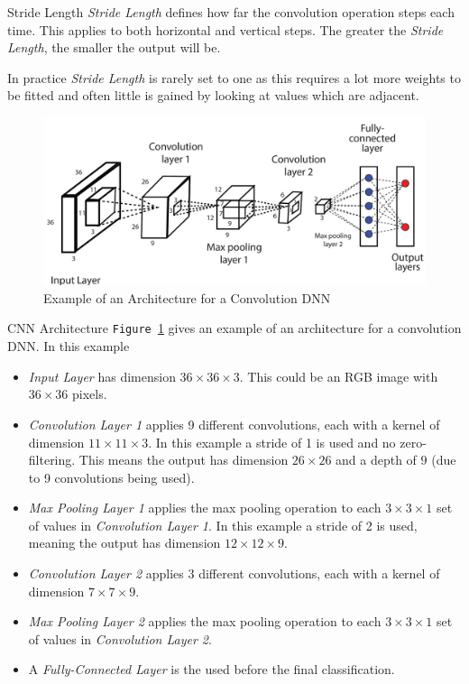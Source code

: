 \documentclass[11pt,a4paper]{article}
\begin{document}
  \begin{definition}{Stride Length}
    \textit{Stride Length} defines how far the convolution operation steps each time. This applies to both horizontal and vertical steps. The greater the \textit{Stride Length}, the smaller the output will be.
    \par In practice \textit{Stride Length} is rarely set to one as this requires a lot more weights to be fitted and often little is gained by looking at values which are adjacent.
  \end{definition}

  \begin{figure}[ht!]
    \centering
    \includegraphics[width=.5\textwidth]{CNNArchitectureDiagram.jpg}
    \caption{Example of an Architecture for a Convolution DNN}
    \label{fig_CNN}
  \end{figure}

  \begin{example}{CNN Architecture}
    \texttt{Figure \ref{fig_CNN}} gives an example of an architecture for a convolution DNN. In this example
    \begin{itemize}
      \item \textit{Input Layer} has dimension $36\times36\times3$. This could be an RGB image with $36\times36$ pixels.
      \item \textit{Convolution Layer 1} applies 9 different convolutions, each with a kernel of dimension $11\times11\times3$. In this example a stride of 1 is used and no zero-filtering. This means the output has dimension $26\times26$ and a depth of $9$ (due to 9 convolutions being used).
      \item \textit{Max Pooling Layer 1} applies the max pooling operation to each  $3\times3\times1$ set of values in \textit{Convolution Layer 1}. In this example a stride of 2 is used, meaning the output has dimension $12\times12\times9$.
      \item \textit{Convolution Layer 2} applies 3 different convolutions, each with a kernel of dimension $7\times7\times9$.
      \item \textit{Max Pooling Layer 2} applies the max pooling operation to each $3\times3\times1$ set of values in \textit{Convolution Layer 2}.
      \item A \textit{Fully-Connected Layer} is the used before the final classification.
    \end{itemize}
  \end{example}
\end{document}
